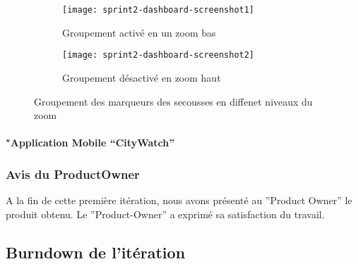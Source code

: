 \begin{figure}[htbp]
    \begin{subfigure}{.5\textwidth}
    \centering
  \centering
  \texttt{[image: sprint2-dashboard-screenshot1]}
  \caption{Groupement activé en un zoom bas}
  \label{fig:sprint2-dashboard-screenshot1}
\end{subfigure}
\begin{subfigure}{.5\textwidth}
    \centering
  \centering
  \texttt{[image: sprint2-dashboard-screenshot2]}
  \caption{Groupement désactivé en zoom haut}
  \label{fig:sprint2-dashboard-screenshot2}
\end{subfigure}
\caption{Groupement des marqueurs des secousses en diffenet niveaux du zoom}
\end{figure}

\paragraph{"Application Mobile ``CityWatch''}

\subsubsection{Avis du ProductOwner}
A la fin de cette première itération, nous avons présenté au ”Product Owner” le produit
obtenu. Le ”Product-Owner” a exprimé sa satisfaction du travail.

\subsection{Burndown de l’itération}
